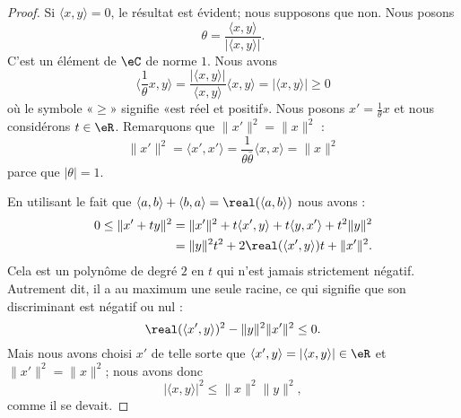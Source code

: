 \begin{proof}
    Si \( \langle x, y\rangle =0\), le résultat est évident; nous supposons que non. Nous posons
    \begin{equation}
        \theta=\frac{ \langle x, y\rangle  }{ | \langle x, y\rangle  | }.
    \end{equation}
    C'est un élément de \( \eC\) de norme \( 1\). Nous avons
    \begin{equation}
        \langle \frac{1}{ \theta }x, y\rangle =\frac{ | \langle x, y\rangle  | }{ \langle x, y\rangle  }\langle x, y\rangle =| \langle x, y\rangle  |\geq 0
    \end{equation}
    où le symbole «\( \geq\)» signifie «est réel et positif». Nous posons \( x'=\frac{1}{ \theta }x\) et nous considérons \( t\in \eR\). Remarquons que \( \| x' \|^2=\| x \|^2\) :
    \begin{equation}
        \| x' \|^2=\langle x', x'\rangle =\frac{1}{ \theta\bar\theta }\langle x, x\rangle =\| x \|^2
    \end{equation}
    parce que \( | \theta |=1\).

    En utilisant le fait que \( \langle a, b\rangle +\langle b, a\rangle =\real(\langle a, b\rangle )\) nous avons :
    \begin{subequations}
        \begin{align}
            0\leq \| x'+ty \|^2&=\| x' \|^2+t\langle x', y\rangle +t\langle y, x'\rangle +t^2\| y \|^2\\
            &=\| y \|^2t^2+2\real(\langle x', y\rangle )t+\| x' \|^2.
        \end{align}
    \end{subequations}
    Cela est un polynôme de degré \( 2\) en \( t\) qui n'est jamais strictement négatif. Autrement dit, il a au maximum une seule racine, ce qui signifie que son discriminant est négatif ou nul :
    \begin{equation}
        \real(\langle x', y\rangle )^2-\| y \|^2\| x' \|^2\leq 0.
    \end{equation}
    Mais nous avons choisi \( x'\) de telle sorte que \( \langle x', y\rangle =| \langle x, y\rangle  |\in \eR\) et \( \| x' \|^2=\| x \|^2\); nous avons donc
    \begin{equation}
        | \langle x, y\rangle  |^2\leq \| x \|^2\| y \|^2,
    \end{equation}
    comme il se devait.
\end{proof}

